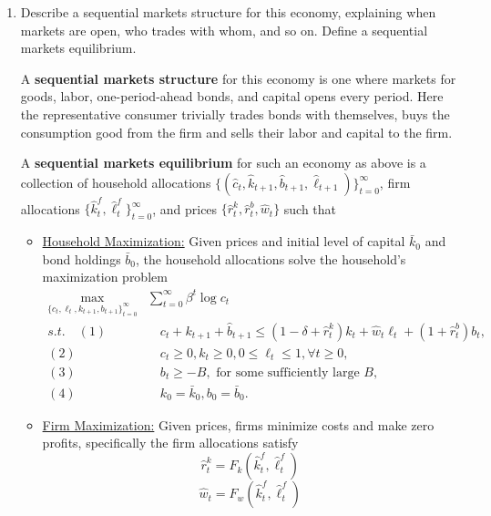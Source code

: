 \documentclass[11pt,english]{article}
\begin{document}
\begin{enumerate}[label=(\alph*)]
\begin{solution}
\begin{itemize}
\item \underline{Market Clearing:} The allocations also satisfy the following market clearing conditions\begin{align*}
[Goods]&: \hat{c}_t + \hat{k}_{t+1}  = F(\hat{k}_t^f, \hat{\ell}_t^f) + (1 - \delta)\hat{k}_t,\\
[Labor]&: \hat{\ell}_t = \hat{\ell}_t^f,\\
[Capital]&: \hat{k}_t = \hat{k}_t^f.
\end{align*}
\end{itemize}
\end{solution}
    \item Describe a sequential markets structure for this economy, explaining when markets are open, who trades with whom, and so on. Define a sequential markets equilibrium.
\begin{solution}
A \textbf{sequential markets structure} for this economy is one where markets for goods, labor, one-period-ahead bonds, and capital opens every period. Here the representative consumer trivially trades bonds with themselves, buys the consumption good from the firm and sells their labor and capital to the firm.

A \textbf{sequential markets equilibrium} for such an economy as above is a collection of household allocations $\{( \hat{c}_t, \hat{k}_{t+1}, \hat{b}_{t+1}, \hat{\ell}_{t+1})\}_{t=0}^\infty$, firm allocations $\{\hat{k}_t^f, \hat{\ell}_t^f\}_{t=0}^\infty$, and prices $\{\hat{r}_t^k, \hat{r}^b_t, \hat{w}_t\}$ such that 
\begin{itemize}
\item \underline{Household Maximization:} Given prices and initial level of capital $\bar{k}_0$ and bond holdings $\bar{b}_0$, the household allocations solve the household's maximization problem \begin{align*}
\max_{\{c_t, \ell_t, k_{t+1}, b_{t+1}\}_{t=0}^\infty} &\sum_{t=0}^\infty \beta^t \log c_t\\
s.t.\quad  (1)& \quad c_t + k_{t+1} + \hat{b}_{t+1}  \leq (1 - \delta + \hat{r}^k_t)k_t + \hat{w}_t \ell_t +   (1 + \hat{r}_t^b)b_{t},\\
(2)& \quad c_t \geq 0, k_t \geq 0, 0 \leq \ell_t \leq 1,\forall t\geq 0,\\
(3)&\quad b_t \geq -B,\text{ for some sufficiently large } B,\\
(4)&\quad k_0 = \bar{k}_0, b_0 = \bar{b}_0.
\end{align*}
\item \underline{Firm Maximization:} Given prices, firms minimize costs and make zero profits, specifically the firm allocations satisfy
$$\hat{r}^k_t = F_k(\hat{k}_t^f, \hat{\ell}^f_t)$$
$$\hat{w}_t = F_w(\hat{k}_t^f, \hat{\ell}^f_t)$$


\end{itemize}
\end{solution}
\end{enumerate}
\end{document}
